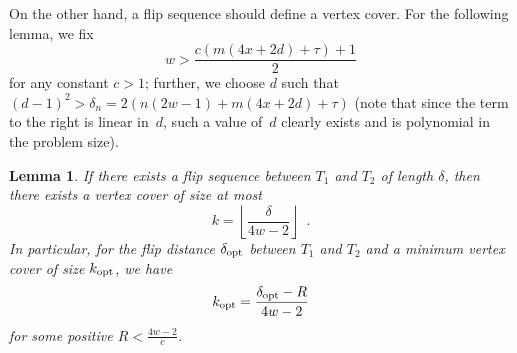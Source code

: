 \documentclass[11pt,a4paper]{article}
\newtheorem{lemma}[theorem]{Lemma}
\begin{document}
On the other hand, a flip sequence should define a vertex cover.
For the following lemma, we fix
\[
w > \frac{c(m(4x+2d) + \tau) + 1}{2}
\]
for any constant $c > 1$; further, we choose $d$ such that $(d-1)^2 > \delta_n = 2(n(2w-1) + m(4x+2d) + \tau)$ (note that since the term to the right is linear in~$d$, such a value of~$d$ clearly exists and is polynomial in the problem size).
\begin{lemma}\label{lem_cover_from_flip}
If there exists a flip sequence between $T_1$ and $T_2$ of length $\delta$, then there exists a vertex cover of size at most
\begin{equation}\label{eqn_delta_to_k}
k = \left \lfloor \frac{\delta}{4w-2} \right \rfloor \enspace.
\end{equation}
In particular, for the flip distance $\delta_{\mathrm{opt}}$ between $T_1$ and $T_2$ and a minimum vertex cover of size $k_{\mathrm{opt}}$, we have 
\begin{equation}\label{eqn_delta_opt_to_k_opt}
k_{\mathrm{opt}} = \frac{\delta_{\mathrm{opt}} - R}{4w-2}
\end{equation}
for some positive $R < \frac{4w-2}{c}$.
\end{lemma}
\end{document}
